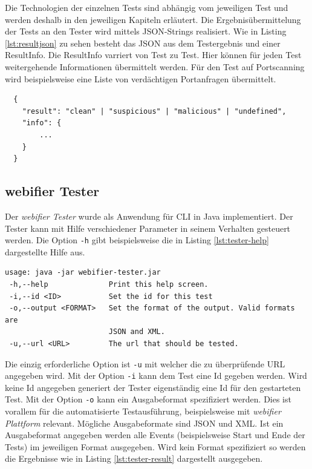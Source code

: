 Die Technologien der einzelnen Tests sind abhängig vom jeweiligen Test und werden deshalb in den
jeweiligen Kapiteln erläutert. Die Ergebnisübermittelung der Tests an den Tester wird mittels
\ac{JSON}-Strings realisiert. Wie in Listing \ref{lst:resultjson} zu sehen besteht das \ac{JSON} aus dem
Testergebnis und einer ResultInfo. Die ResultInfo varriert von Test zu Test. Hier können für jeden
Test weitergehende Informationen übermittelt werden. Für den Test auf Portscanning wird
beispielsweise eine Liste von verdächtigen Portanfragen übermittelt.

\begin{scriptsize}
\begin{lstlisting}
  {
  	"result": "clean" | "suspicious" | "malicious" | "undefined",
  	"info": {
  		...
  	}
  }
\end{lstlisting}
\end{scriptsize}


\subsection{webifier Tester}

Der \textit{webifier Tester} wurde als Anwendung für \ac{CLI} in Java implementiert. Der Tester
kann mit Hilfe verschiedener Parameter in seinem Verhalten gesteuert werden. Die Option
\lstinline[style=eclipse]{-h} gibt beispielsweise die in Listing \ref{lst:tester-help} dargestellte
Hilfe aus.

\begin{scriptsize}
\begin{lstlisting}
usage: java -jar webifier-tester.jar
 -h,--help              Print this help screen.
 -i,--id <ID>           Set the id for this test
 -o,--output <FORMAT>   Set the format of the output. Valid formats are
                        JSON and XML.
 -u,--url <URL>         The url that should be tested.
\end{lstlisting}
\end{scriptsize}

Die einzig erforderliche Option ist \lstinline[style=eclipse]{-u} mit welcher die zu überprüfende
\acs{URL} angegeben wird. Mit der Option \lstinline[style=eclipse]{-i} kann dem Test eine Id gegeben
werden. Wird keine Id angegeben generiert der Tester eigenständig eine Id für den gestarteten Test.
Mit der Option \lstinline[style=eclipse]{-o} kann ein Ausgabeformat spezifiziert werden. Dies ist
vorallem für die automatisierte Testausführung, beispielsweise mit \textit{webifier Plattform}
relevant. Mögliche Ausgabeformate sind \ac{JSON} und \ac{XML}. Ist ein Ausgabeformat angegeben
werden alle Events (beispielsweise Start und Ende der Tests) im jeweiligen Format ausgegeben. Wird
kein Format spezifiziert so werden die Ergebnisse wie in Listing \ref{lst:tester-result}
dargestellt ausgegeben.

